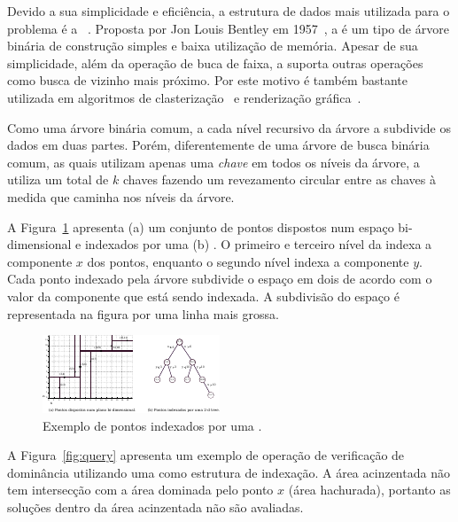 Devido a sua simplicidade e eficiência, a estrutura de dados mais utilizada
para o problema é a \emph{\kdtree}~\cite{preparata2012computational}.
Proposta por Jon Louis Bentley em 1957~\cite{bentley1975}, a \kdtree{} é um tipo de
árvore binária de construção simples e baixa utilização de memória.
Apesar de sua simplicidade, além da operação de buca de faixa, a \kdtree{}
suporta outras operações como busca de vizinho mais próximo.
Por este motivo é também bastante utilizada em algoritmos de
clasterização~\cite{kanungo2002efficient, indyk1998approximate}
e renderização gráfica~\cite{owens2007survey}.

Como uma árvore binária comum, a cada nível recursivo da árvore
a \kdtree{} subdivide os dados em duas partes.
Porém, diferentemente de uma árvore de busca binária comum, as quais utilizam
apenas uma \emph{chave} em todos os níveis da árvore, a \kdtree{} utiliza um
total de $k$ chaves fazendo um revezamento circular entre as chaves à medida
que caminha nos níveis da árvore.

A Figura~\ref{fig:kdom-kd} apresenta (a) um conjunto de pontos dispostos num
espaço bi-dimensional e indexados por uma (b) .
O primeiro e terceiro nível da  indexa a componente $x$ dos pontos,
enquanto o segundo nível indexa a componente $y$.
Cada ponto indexado pela árvore subdivide o espaço em dois de acordo
com o valor da componente que está sendo indexada.
A subdivisão do espaço é representada na figura por uma linha mais grossa.

\begin{figure}
  \centering
  \includegraphics[scale=4.8]{img/kdt/dom-kd}
  \caption{Exemplo de pontos indexados por uma \kdtree{}.}
  \label{fig:kdom-kd}
\end{figure}

A Figura~\ref{fig:query} apresenta um exemplo de operação de verificação de
dominância utilizando uma  como estrutura de indexação.
A área acinzentada não tem intersecção com a área dominada pelo ponto $x$
(área hachurada), portanto as soluções dentro da área acinzentada não são
avaliadas.


